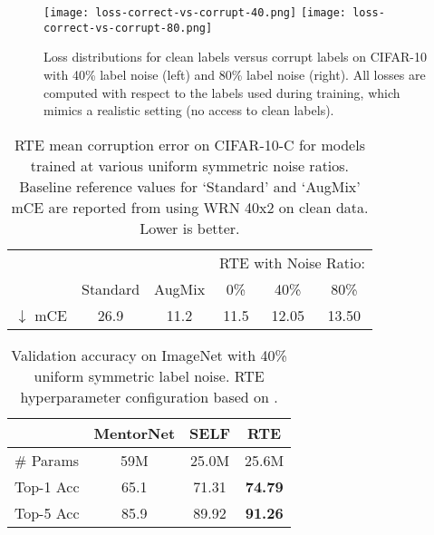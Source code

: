 \documentclass{article}
\renewcommand{\b}[1]{\textbf{#1}}
\begin{document}
\begin{figure}
  \centering
  \texttt{[image: loss-correct-vs-corrupt-40.png]}
  \texttt{[image: loss-correct-vs-corrupt-80.png]}
  \caption{Loss distributions for clean labels versus corrupt labels on CIFAR-10 with 40\% label noise (left) and 80\% label noise (right). All losses are computed with respect to the labels used during training, which mimics a realistic setting (no access to clean labels).}
  \label{fig:loss-correct-vs-corrupt}
\end{figure}

\begin{table}\renewcommand{\arraystretch}{1.3}
    \centering
    \caption{RTE mean corruption error on CIFAR-10-C for models trained at various uniform symmetric noise ratios.  Baseline reference values for `Standard' and `AugMix' mCE are reported from \cite{hendrycks2020augmix} using WRN 40x2 on clean data. Lower is better.}\begin{tabular}{lcc|ccc} 
        \toprule
        \multicolumn{3}{l}{} & \multicolumn{3}{l}{RTE with Noise Ratio:}\\
        &Standard & AugMix & 0\% & 40\% & 80\% \\
        \hline
$\downarrow$ mCE & 26.9 & 11.2 & 11.5 & 12.05 & 13.50 \\
        \bottomrule
    \end{tabular}
    \label{tab:mce}
\end{table}

\begin{table}
\renewcommand{\arraystretch}{1.3}
    \centering
    \caption{Validation accuracy on ImageNet with 40\% uniform symmetric label noise. RTE hyperparameter configuration based on \cite{hendrycks2020augmix}.} \begin{tabular}{lccc}
        \toprule & MentorNet \cite{jiang2018} & SELF \cite{nguyen2020}   & RTE \\
        \hline
        \# Params   & 59M       & 25.0M   & 25.6M     \\
        Top-1 Acc   & 65.1      & 71.31   & \b{74.79} \\
        Top-5 Acc   & 85.9      & 89.92   & \b{91.26} \\
        \bottomrule
    \end{tabular}
    \label{tab:uniformnoiseimagenet}
\end{table}
\end{document}
